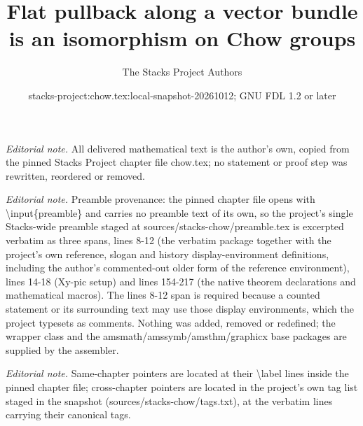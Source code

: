 \documentclass[10pt,a4paper]{amsart}
\title{Flat pullback along a vector bundle is an isomorphism on Chow groups}
\author{The Stacks Project Authors}
\date{stacks-project:chow.tex:local-snapshot-20261012; GNU FDL 1.2 or later}
\theoremstyle{plain}
\theoremstyle{definition}
\theoremstyle{remark}
\numberwithin{equation}{subsection}
\begin{document}
\maketitle
\noindent\textit{Editorial note.} All delivered mathematical text is the author's own, copied from the pinned Stacks Project chapter file chow.tex; no statement or proof step was rewritten, reordered or removed.\par\medskip
\noindent\textit{Editorial note.} Preamble provenance: the pinned chapter file opens with \textbackslash{}input\{preamble\} and carries no preamble text of its own, so the project's single Stacks-wide preamble staged at sources/stacks-chow/preamble.tex is excerpted verbatim as three spans, lines 8-12 (the verbatim package together with the project's own reference, slogan and history display-environment definitions, including the author's commented-out older form of the reference environment), lines 14-18 (Xy-pic setup) and lines 154-217 (the native theorem declarations and mathematical macros). The lines 8-12 span is required because a counted statement or its surrounding text may use those display environments, which the project typesets as comments. Nothing was added, removed or redefined; the wrapper class and the amsmath/amssymb/amsthm/graphicx base packages are supplied by the assembler.\par\medskip
\noindent\textit{Editorial note.} Same-chapter pointers are located at their \textbackslash{}label lines inside the pinned chapter file; cross-chapter pointers are located in the project's own tag list staged in the snapshot (sources/stacks-chow/tags.txt), at the verbatim lines carrying their canonical tags.\par\medskip
\end{document}

